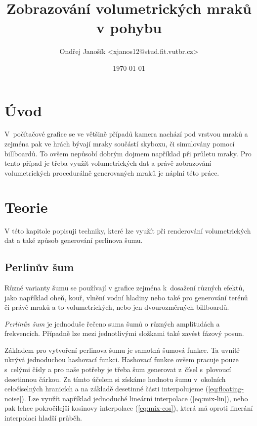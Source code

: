 \documentclass[a4paper, 12pt]{article}
\title{Zobrazování volumetrických mraků v pohybu}
\author{Ondřej Janošík <xjanos12@stud.fit.vutbr.cz>}
\date{\today}
\begin{document}
\maketitle

\section{Úvod}

V~počítačové grafice se ve většině případů kamera nachází pod vrstvou mraků
a zejména pak ve hrách bývají mraky součástí skyboxu,
či simulovány pomocí billboardů. To ovšem nepůsobí dobrým dojmem například
při průletu mraky. Pro tento případ je třeba využít volumetrických dat a právě
zobrazování volumetrických procedurálně generovaných mraků je náplní této práce.


\section{Teorie}

V této kapitole popisuji techniky, které lze využít při renderování
volumetrických dat a také způsob generování perlinova šumu.

\subsection{Perlinův šum}

Různé varianty šumu se používají v grafice zejména k~dosažení různých efektů,
jako například oheň, kouř, vlnění vodní hladiny nebo také pro generování
terénů či právě mraků a to volumetrických, nebo jen dvourozměrných billboardů.

\textit{Perlinův šum} je jednoduše řečeno suma šumů o různých amplitudách
a frekvencích.
Případně lze mezi jednotlivými složkami také zavést fázový posun.

Základem pro vytvoření perlinova šumu je samotná šumová funkce.
Ta uvnitř ukrývá jednoduchou hashovací funkci.
Hashovací funkce ovšem pracuje pouze s~celými čísly a pro naše potřeby je třeba
šum generovat z~čísel s~plovoucí desetinnou čárkou. Za tímto účelem si získáme
hodnotu šumu v~okolních celočíselných hranicích a na základě desetinné části
interpolujeme (\ref{eq:floating-noise}).
Lze využít například jednoduché lineární interpolace (\ref{eq:mix-lin}),
nebo pak lehce pokročilejší kosinovy interpolace (\ref{eq:mix-cos}), která
má oproti linerání interpolaci hladší průběh.
\end{document}
